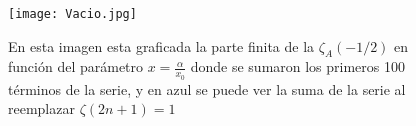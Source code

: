 \begin{figure}
    \centering
    \texttt{[image: Vacio.jpg]}
    \caption{En esta imagen esta graficada la parte finita de la $\zeta _A (-1/2) $ en función del parámetro $x= \frac{\alpha}{x _0}$ donde se sumaron los primeros 100 términos de la serie, y en azul se puede ver la suma de la serie al reemplazar $\zeta (2n+1) = 1$}
    \label{fig:vacio}
\end{figure}






















